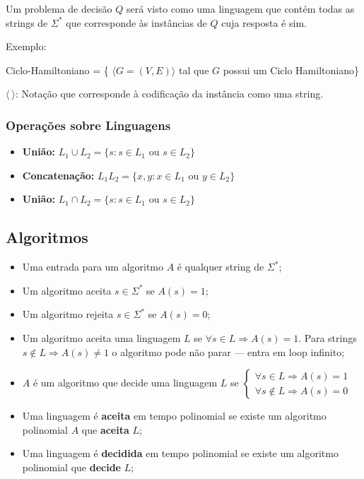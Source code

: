 \documentclass[a4paper,oneside,article,table]{article}
\begin{document}
Um problema de decisão $Q$ será visto como uma linguagem que contém todas as strings de $\Sigma^*$ que corresponde às instâncias de $Q$ cuja resposta é sim.

Exemplo:
\begin{description}
    \item Ciclo-Hamiltoniano = \{ $\langle G = (V, E)\rangle$ tal que $G$ possui um Ciclo Hamiltoniano\}
    \item $\langle~\rangle$: Notação que corresponde à codificação da instância como uma string.
\end{description}

\subsubsection{Operações sobre Linguagens}
\begin{itemize}
    \item \textbf{União:} $L_1\cup L_2 = \{ s : s \in L_1 \textrm{ ou } s \in L_2\}$
    \item \textbf{Concatenação:} $L_1L_2 = \{ x, y : x \in L_1 \textrm{ ou } y \in L_2\}$
    \item \textbf{União:} $L_1 \cap L_2 = \{ s : s \in L_1 \textrm{ ou } s \in L_2\}$
\end{itemize}

\subsection{Algoritmos}
\begin{itemize}
    \item Uma entrada para um algoritmo $A$ é qualquer string de $\Sigma^*$;
    \item Um algoritmo aceita $s\in\Sigma^*$ se $A(s)=1$;
    \item Um algoritmo rejeita $s\in\Sigma^*$ se $A(s)=0$;
    \item Um algoritmo aceita uma linguagem $L$ se $\forall s \in L \Rightarrow A(s)=1$.
        Para strings $s \notin L \Rightarrow A(s) \neq 1$ o algoritmo pode não parar --- entra em loop infinito;
    \item $A$ é um algoritmo que decide uma linguagem $L$ se 
        $\begin{cases}
            \forall s \in L \Rightarrow A(s) = 1\\
            \forall s \notin L \Rightarrow A(s) = 0
        \end{cases}$
    \item Uma linguagem é \textbf{aceita} em tempo polinomial se existe um algoritmo polinomial $A$ que \textbf{aceita} $L$;
    \item Uma linguagem é \textbf{decidida} em tempo polinomial se existe um algoritmo polinomial que \textbf{decide} $L$;

\end{itemize}
\end{document}
